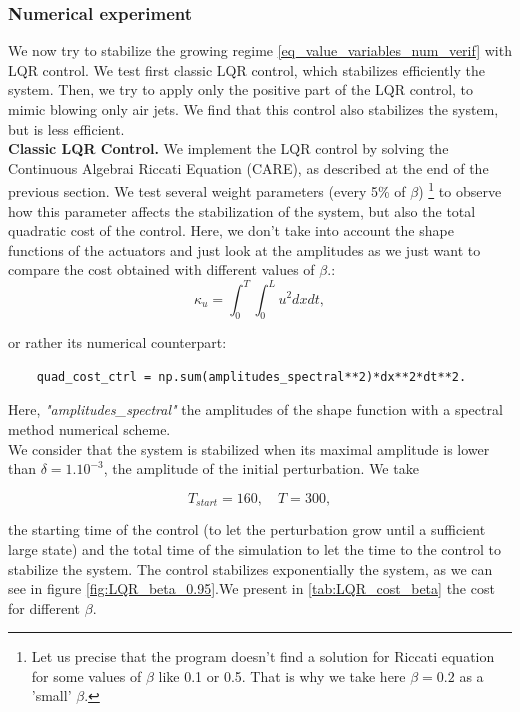 \documentclass[12pt]{article}
\begin{document}
 
\subsubsection{Numerical experiment}
We now try to stabilize the growing regime \eqref{eq_value_variables_num_verif} with LQR
control. We test first classic LQR control, which stabilizes efficiently the system. Then,
we try to apply only the positive part of the LQR control, to mimic blowing only air jets.
We find that this control also stabilizes the system, but is less efficient. 
\\

\textbf{Classic LQR Control.} We implement the LQR control by solving the Continuous Algebrai Riccati Equation
(CARE), as described at the end of the previous section. We test several weight parameters (every 5\% of $\beta$)
\footnote{Let us precise that the program doesn't find a solution for
Riccati equation for some values of $\beta$ like 0.1 or 0.5. That is why we take here $\beta=0.2$
as a 'small' $\beta$.} to observe how this parameter affects the stabilization of the system,
but also the total quadratic cost of the control. Here, we don't take into account the shape functions
 of the actuators and just look at the amplitudes as we just want to compare the cost obtained 
 with different values of $\beta$.: 
\begin{equation}
    \kappa_u = \int_{0}^{T} \int_{0}^{L}u^2 dx dt,
\end{equation}

or rather its numerical counterpart:

\begin{verbatim}
    quad_cost_ctrl = np.sum(amplitudes_spectral**2)*dx**2*dt**2.
\end{verbatim}

Here, \textit{"amplitudes\_spectral"} the amplitudes of the shape function with a spectral method 
numerical scheme.  
\\

We consider that the system is stabilized when its maximal amplitude is lower than $\delta=1.10^{-3}$, the 
amplitude of the initial perturbation. We take 


\begin{equation}
    T_{start} = 160, \quad T=300,
\end{equation}

the starting time of the control (to let the perturbation grow until a sufficient large state) and
the total time of the simulation to let the time to the control to stabilize the system.
The control stabilizes exponentially the system, as we can see in figure \eqref{fig:LQR_beta_0.95}.We 
present in \eqref{tab:LQR_cost_beta} the cost for different $\beta$.
\end{document}
